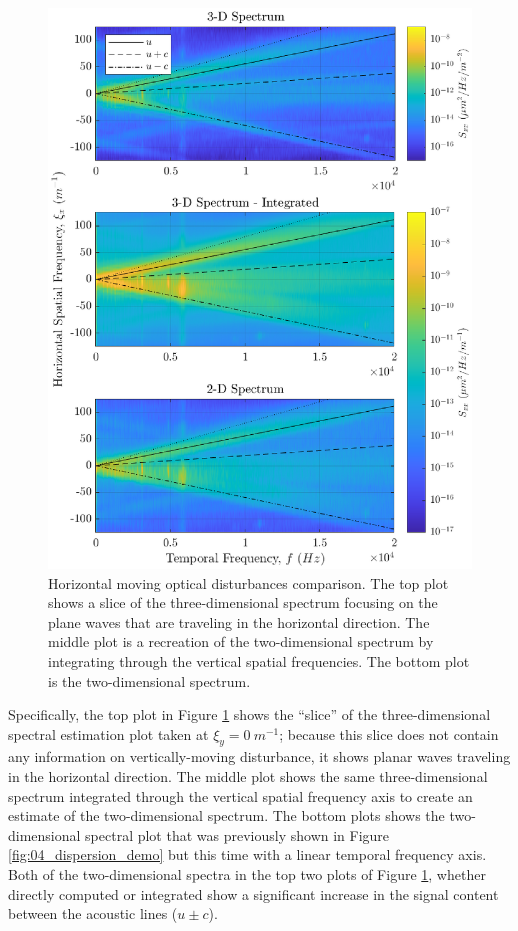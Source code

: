 \begin{figure}
  \centering
  \includegraphics{../matlab/04_dispersion_analysis/dispersion_comparison.eps}
  \caption{Horizontal moving optical disturbances comparison. The top plot shows a slice of the three-dimensional spectrum focusing on the plane waves that are traveling in the horizontal direction. The middle plot is a recreation of the two-dimensional spectrum by integrating through the vertical spatial frequencies. The bottom plot is the two-dimensional spectrum.}
  \label{fig:04_dispersion_comparison}
\end{figure}
Specifically, the top plot in Figure \ref{fig:04_dispersion_comparison} shows the ``slice'' of the three-dimensional spectral estimation plot taken at $\xi_y=0\ m^{-1}$; because this slice does not contain any information on vertically-moving disturbance, it shows planar waves traveling in the horizontal direction.
The middle plot shows the same three-dimensional spectrum integrated through the vertical spatial frequency axis to create an estimate of the two-dimensional spectrum.
The bottom plots shows the two-dimensional spectral plot that was previously shown in Figure \ref{fig:04_dispersion_demo} but this time with a linear temporal frequency axis.
Both of the two-dimensional spectra in the top two plots of Figure \ref{fig:04_dispersion_comparison}, whether directly computed or integrated show a significant increase in the signal content between the acoustic lines ($u\pm c$).

